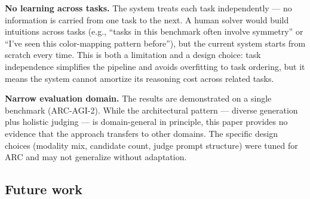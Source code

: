 \documentclass[11pt]{article}
\begin{document}
\textbf{No learning across tasks.} The system treats each task
independently --- no information is carried from one task to the next. A
human solver would build intuitions across tasks (e.g., ``tasks in this
benchmark often involve symmetry'' or ``I've seen this color-mapping
pattern before''), but the current system starts from scratch every
time. This is both a limitation and a design choice: task independence
simplifies the pipeline and avoids overfitting to task ordering, but it
means the system cannot amortize its reasoning cost across related
tasks.

\textbf{Narrow evaluation domain.} The results are demonstrated on a
single benchmark (ARC-AGI-2). While the architectural pattern ---
diverse generation plus holistic judging --- is domain-general in
principle, this paper provides no evidence that the approach transfers
to other domains. The specific design choices (modality mix, candidate
count, judge prompt structure) were tuned for ARC and may not generalize
without adaptation.

\hypertarget{future-work}{%
\subsection{Future work}\label{future-work}}
\end{document}
